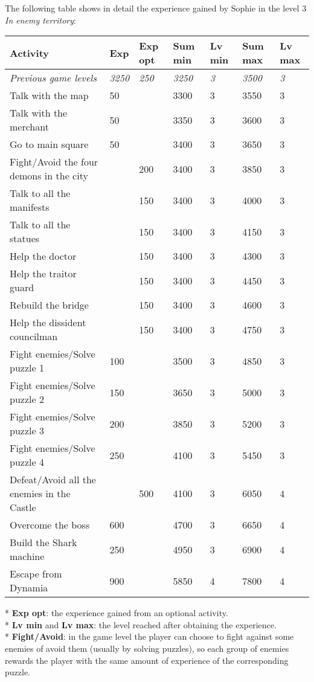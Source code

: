 The following table shows in detail the experience gained by Sophie in the level 3 \textit{In enemy territory}:
\begin{table}[H]
\centering
\begin{tabular}{|p{4cm}|l|l|l|l|l|l|}
\hline
\rowcolor[HTML]{C0C0C0} 
\textbf{Activity} & \textbf{Exp} & \textbf{Exp opt} & \textbf{Sum min} & \textbf{Lv min} & \textbf{Sum max} & \textbf{Lv max} \\ \hline
\textit{Previous game levels} & \textit{3250} & \textit{250} & \textit{3250} & \textit{3} & \textit{3500} & \textit{3} \\ \hline
Talk with the map & 50 &  & 3300 & 3 & 3550 & 3 \\ \hline
Talk with the merchant & 50 &  & 3350 & 3 & 3600 & 3 \\ \hline
Go to main square & 50 &  & 3400 & 3 & 3650 & 3 \\ \hline
Fight/Avoid the four demons in the city &  & 200 & 3400 & 3 & 3850 & 3 \\ \hline
Talk to all the manifests &  & 150 & 3400 & 3 & 4000 & 3 \\ \hline
Talk to all the statues &  & 150 & 3400 & 3 & 4150 & 3 \\ \hline
Help the doctor &  & 150 & 3400 & 3 & 4300 & 3 \\ \hline
Help the traitor guard &  & 150 & 3400 & 3 & 4450 & 3 \\ \hline
Rebuild the bridge &  & 150 & 3400 & 3 & 4600 & 3 \\ \hline
Help the dissident councilman &  & 150 & 3400 & 3 & 4750 & 3 \\ \hline
Fight enemies/Solve puzzle 1 & 100 &  & 3500 & 3 & 4850 & 3 \\ \hline
Fight enemies/Solve puzzle 2 & 150 &  & 3650 & 3 & 5000 & 3 \\ \hline
Fight enemies/Solve puzzle 3 & 200 &  & 3850 & 3 & 5200 & 3 \\ \hline
Fight enemies/Solve puzzle 4 & 250 &  & 4100 & 3 & 5450 & 3 \\ \hline
Defeat/Avoid all the enemies in the Castle &  & 500 & 4100 & 3 & 6050 & 4 \\ \hline
Overcome the boss & 600 &  & 4700 & 3 & 6650 & 4 \\ \hline
Build the Shark machine & 250 &  & 4950 & 3 & 6900 & 4 \\ \hline
Escape from Dynamia & 900 &  & 5850 & 4 & 7800 & 4 \\ \hline
\end{tabular}
\end{table}
* \textbf{Exp opt}: the experience gained from an optional activity. \\
* \textbf{Lv min} and \textbf{Lv max}: the level reached after obtaining the experience. \\
* \textbf{Fight/Avoid}: in the game level the player can choose to fight against some enemies of avoid them (usually by solving puzzles), so each group of enemies rewards the player with the same amount of experience of the corresponding puzzle.
